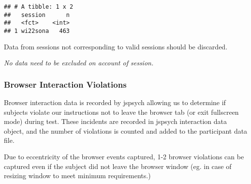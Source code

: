 \documentclass[
]{article}
\newenvironment{Shaded}{\begin{snugshade}}{\end{snugshade}}
\newcommand{\AttributeTok}[1]{\textcolor[rgb]{0.77,0.63,0.00}{#1}}
\newcommand{\CommentTok}[1]{\textcolor[rgb]{0.56,0.35,0.01}{\textit{#1}}}
\newcommand{\FunctionTok}[1]{\textcolor[rgb]{0.00,0.00,0.00}{#1}}
\newcommand{\NormalTok}[1]{#1}
\newcommand{\OtherTok}[1]{\textcolor[rgb]{0.56,0.35,0.01}{#1}}
\newcommand{\SpecialCharTok}[1]{\textcolor[rgb]{0.00,0.00,0.00}{#1}}
\newcommand{\StringTok}[1]{\textcolor[rgb]{0.31,0.60,0.02}{#1}}
\begin{document}
\begin{verbatim}
## # A tibble: 1 x 2
##   session      n
##   <fct>    <int>
## 1 wi22sona   463
\end{verbatim}

Data from sessions not corresponding to valid sessions should be
discarded.

\begin{Shaded}
\end{Shaded}

\emph{No data need to be excluded on account of session.}

\hypertarget{browser-interaction-violations}{%
\subsubsection{Browser Interaction
Violations}\label{browser-interaction-violations}}

Browser interaction data is recorded by jspsych allowing us to determine
if subjects violate our instructions not to leave the browser tab (or
exit fullscreen mode) during test. These incidents are recorded in
jspsych interaction data object, and the number of violations is counted
and added to the participant data file.

Due to eccentricity of the browser events captured, 1-2 browser
violations can be captured even if the subject did not leave the browser
window (eg. in case of resizing window to meet minimum requirements.)
\end{document}

